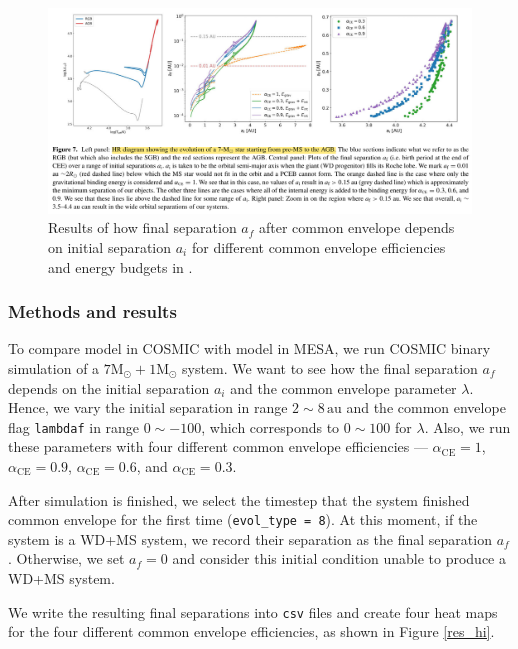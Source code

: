 \documentclass[12pt]{article}
\newcommand{\Msun}{\mathrm{M_{\odot}}}
\newcommand{\alphace}{\alpha_{\mathrm{CE}}}
\newcommand{\au}{\, \mathrm{au}}
\begin{document}
\begin{figure}
    \centering
    \includegraphics[width=\linewidth]{yamaguchi-7+1.png}
    \caption{Results of how final separation $a_f$ after common envelope depends on initial separation $a_i$ for different common envelope efficiencies and energy budgets in \cite{yamaguchi_hi}.}
    \label{yam_hi}
\end{figure}

\subsubsection{Methods and results}
To compare model in COSMIC with model in MESA, we run COSMIC binary simulation of a $7\Msun + 1\Msun$ system. We want to see how the final separation $a_f$ depends on the initial separation $a_i$ and the common envelope parameter $\lambda$. Hence, we vary the initial separation in range $2 \sim 8 \au$ and the common envelope flag \verb|lambdaf| in range $0 \sim -100$, which corresponds to $0 \sim 100$ for $\lambda$. Also, we run these parameters with four different common envelope efficiencies — $\alphace = 1$, $\alphace = 0.9$, $\alphace = 0.6$, and $\alphace = 0.3$.

After simulation is finished, we select the timestep that the system finished common envelope for the first time (\verb|evol_type = 8|). At this moment, if the system is a WD+MS system, we record their separation as the final separation $a_f$. Otherwise, we set $a_f = 0$ and consider this initial condition unable to produce a WD+MS system.

We write the resulting final separations into \verb|csv| files and create four heat maps for the four different common envelope efficiencies, as shown in Figure \ref{res_hi}.
\end{document}
